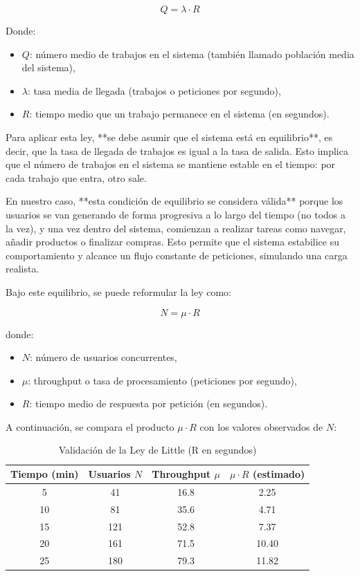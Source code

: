 \documentclass[10pt]{book}
\begin{document}
\[
Q = \lambda \cdot R
\]

Donde:

\begin{itemize}
    \item \( Q \): número medio de trabajos en el sistema (también llamado población media del sistema),
    \item \( \lambda \): tasa media de llegada (trabajos o peticiones por segundo),
    \item \( R \): tiempo medio que un trabajo permanece en el sistema (en segundos).
\end{itemize}

Para aplicar esta ley, **se debe asumir que el sistema está en equilibrio**, es decir, que la tasa de llegada de trabajos es igual a la tasa de salida. Esto implica que el número de trabajos en el sistema se mantiene estable en el tiempo: por cada trabajo que entra, otro sale.

En nuestro caso, **esta condición de equilibrio se considera válida** porque los usuarios se van generando de forma progresiva a lo largo del tiempo (no todos a la vez), y una vez dentro del sistema, comienzan a realizar tareas como navegar, añadir productos o finalizar compras. Esto permite que el sistema estabilice su comportamiento y alcance un flujo constante de peticiones, simulando una carga realista.

Bajo este equilibrio, se puede reformular la ley como:

\[
N = \mu \cdot R
\]

donde:

\begin{itemize}
    \item \(N\): número de usuarios concurrentes,
    \item \(\mu\): throughput o tasa de procesamiento (peticiones por segundo),
    \item \(R\): tiempo medio de respuesta por petición (en segundos).
\end{itemize}

A continuación, se compara el producto \(\mu \cdot R\) con los valores observados de \(N\):

\begin{table}[H]
\centering
\begin{tabular}{|c|c|c|c|}
\hline
\textbf{Tiempo (min)} & \textbf{Usuarios \(N\)} & \textbf{Throughput \(\mu\)} & \textbf{\(\mu \cdot R\) (estimado)} \\
\hline
5  & 41  & 16.8  & 2.25 \\
10 & 81  & 35.6  & 4.71 \\
15 & 121 & 52.8  & 7.37 \\
20 & 161 & 71.5  & 10.40 \\
25 & 180 & 79.3  & 11.82 \\
\hline
\end{tabular}
\caption{Validación de la Ley de Little (R en segundos)}
\end{table}
\end{document}

